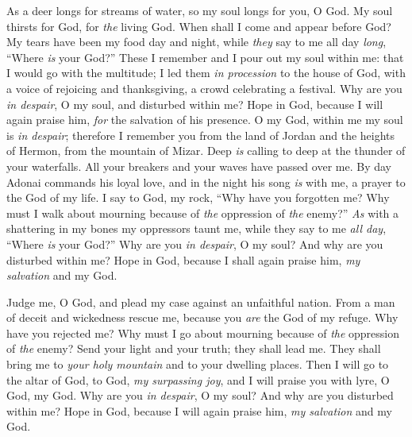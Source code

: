 \begin{biblechapter} %
 As a deer longs for streams of water, 
so my soul longs for you, O God.
\verse My soul thirsts for God, for \textit{the} living God. 
When shall I come and appear before God?
\verse My tears have been my food day and night, 
while \textit{they} say to me all day \textit{long}, 
“Where \textit{is} your God?”
\verse These I remember and I pour out my soul within me: 
that I would go with the multitude; 
I led them \textit{in procession} to the house of God, 
with a voice of rejoicing and thanksgiving, 
a crowd celebrating a festival.
\verse Why are you \textit{in despair}, O my soul, 
and disturbed within me? 
Hope in God, because I will again praise him, 
\textit{for} the salvation of his presence.
\verse O my God, within me my soul is \textit{in despair}; 
therefore I remember you from the land of Jordan 
and the heights of Hermon, from the mountain of Mizar.
\verse Deep \textit{is} calling to deep 
at the thunder of your waterfalls. 
All your breakers and your waves 
have passed over me.
\verse By day Adonai commands his loyal love, 
and in the night his song \textit{is} with me, 
a prayer to the God of my life.
\verse I say to God, my rock, 
“Why have you forgotten me? 
Why must I walk about mourning 
because of \textit{the} oppression of \textit{the} enemy?”
\verse \textit{As} with a shattering in my bones 
my oppressors taunt me, 
while they say to me \textit{all day}, 
“Where \textit{is} your God?”
\verse Why are you \textit{in despair}, O my soul? 
And why are you disturbed within me? 
Hope in God, because I shall again praise him, 
\textit{my salvation} and my God.
\end{biblechapter}

\begin{biblechapter} %
 Judge me, O God, and plead my case 
against an unfaithful nation. 
From a man of deceit and wickedness rescue me,
\verse because you \textit{are} the God of my refuge. 
Why have you rejected me? 
Why must I go about mourning 
because of \textit{the} oppression of \textit{the} enemy?
\verse Send your light and your truth; 
they shall lead me. 
They shall bring me to \textit{your holy mountain} 
and to your dwelling places.
\verse Then I will go to the altar of God, 
to God, \textit{my surpassing joy}, 
and I will praise you with lyre, 
O God, my God.
\verse Why are you \textit{in despair}, O my soul? 
And why are you disturbed within me? 
Hope in God, because I will again praise him, 
\textit{my salvation} and my God.
\end{biblechapter}

